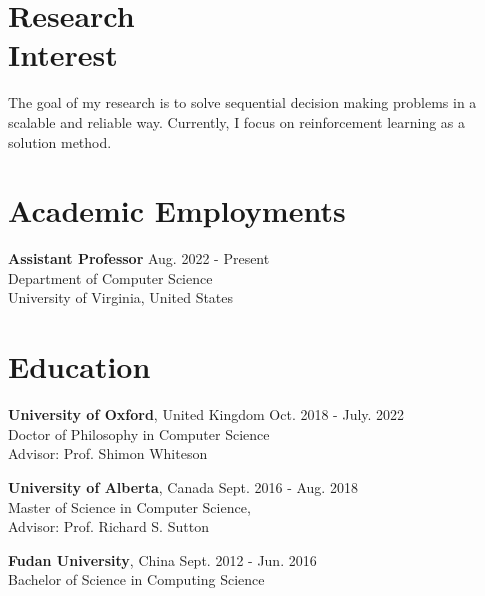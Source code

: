 \documentclass[margin, 10pt]{res} %
\begin{document}
\begin{resume}

 
\section{Research \\ Interest}  
The goal of my research is to solve sequential decision making problems in a scalable and reliable way.
Currently, I focus on reinforcement learning as a solution method.


\section{Academic Employments}
{\textbf{Assistant Professor}} \hfill Aug. 2022 - Present \\
Department of Computer Science \\
University of Virginia, United States

\section{Education}

{\textbf{University of Oxford}, United Kingdom}  \hfill Oct. 2018 - July. 2022 \\
Doctor of Philosophy in Computer Science \\
Advisor: Prof. Shimon Whiteson

{\textbf{University of Alberta}, Canada}  \hfill Sept. 2016 - Aug. 2018 \\
Master of Science in Computer Science,  \\
Advisor: Prof. Richard S. Sutton

{\textbf{Fudan University}, China}  \hfill Sept. 2012 - Jun. 2016 \\
Bachelor of Science in Computing Science



\end{resume}
\end{document}
